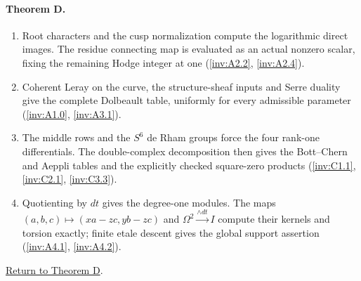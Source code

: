 \documentclass[11pt,a4paper]{article}
\theoremstyle{definition}
\begin{document}
\paragraph{Theorem D.}
\begin{enumerate}[label=\arabic*.]
\item\hypertarget{step-I-D-1}{} Root characters and the cusp
normalization compute the logarithmic direct images.  The residue
connecting map is evaluated as an actual nonzero scalar, fixing
the remaining Hodge integer at one
(\hyperref[inv:A2.2]{\ref*{inv:A2.2}},
\hyperref[inv:A2.4]{\ref*{inv:A2.4}}).
\item\hypertarget{step-I-D-2}{} Coherent Leray on the curve,
the structure-sheaf inputs and Serre duality give the complete
Dolbeault table, uniformly for every admissible parameter
(\hyperref[inv:A1.0]{\ref*{inv:A1.0}},
\hyperref[inv:A3.1]{\ref*{inv:A3.1}}).
\item\hypertarget{step-I-D-3}{} The middle rows and the
$S^6$ de Rham groups force the four rank-one differentials.
The double-complex decomposition then gives the Bott--Chern and
Aeppli tables and the explicitly checked square-zero products
(\hyperref[inv:C1.1]{\ref*{inv:C1.1}},
\hyperref[inv:C2.1]{\ref*{inv:C2.1}},
\hyperref[inv:C3.3]{\ref*{inv:C3.3}}).
\item\hypertarget{step-I-D-4}{} Quotienting by $dt$ gives the
degree-one modules.  The maps $(a,b,c)\mapsto(xa-zc,yb-zc)$
and $\Omega^2\xrightarrow{\wedge dt}I$ compute their kernels
and torsion exactly; finite etale descent gives the global
support assertion
(\hyperref[inv:A4.1]{\ref*{inv:A4.1}},
\hyperref[inv:A4.2]{\ref*{inv:A4.2}}).
\end{enumerate}
\hyperlink{main-I-D}{Return to Theorem D}.

\hypertarget{outline-I-E}{}
\end{document}
